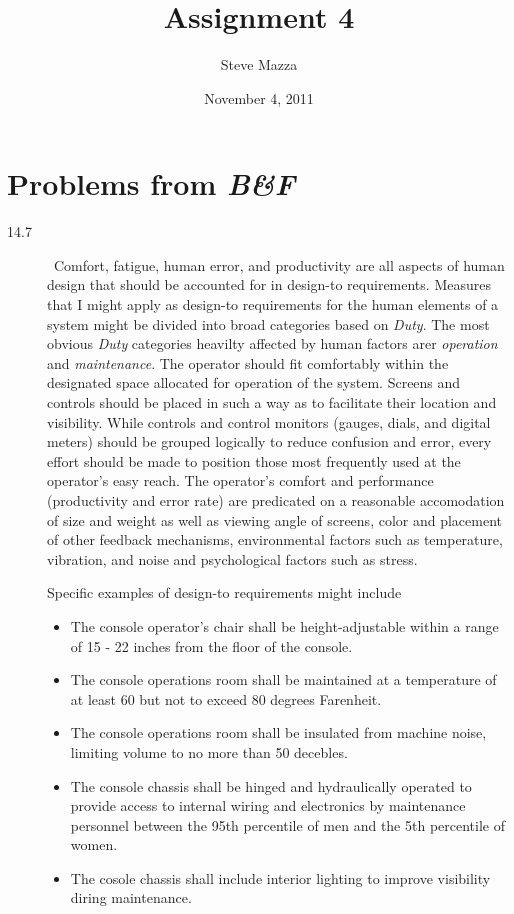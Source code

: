\documentclass[letterpaper,10pt]{article}
\title{Assignment 4}
\author{Steve Mazza}
\date{November 4, 2011}
\begin{document}
\maketitle

\section{Problems from \emph{B\&F}}
\begin{description}
\item[14.7]\ Comfort, fatigue, human error, and productivity are all aspects of human design that should be accounted for in design-to requirements.  Measures that I might apply as design-to requirements for the human elements of a system might be divided into broad categories based on \emph{Duty}.  The most obvious \emph{Duty} categories heavilty affected by human factors arer \emph{operation} and \emph{maintenance}.  The operator should fit comfortably within the designated space allocated for operation of the system.  Screens and controls should be placed in such a way as to facilitate their location and visibility.  While controls and control monitors (gauges, dials, and digital meters) should be grouped logically to reduce confusion and error, every effort should be made to position those most frequently used at the operator's easy reach.  The operator's comfort and performance (productivity and error rate) are predicated on a reasonable accomodation of size and weight as well as viewing angle of screens, color and placement of other feedback mechanisms, environmental factors such as temperature, vibration, and noise and psychological factors such as stress.
\par Specific examples of design-to requirements might include
\begin{itemize}
\item The console operator's chair shall be height-adjustable within a range of 15 - 22 inches from the floor of the console. 
\item The console operations room shall be maintained at a temperature of at least 60 but not to exceed 80 degrees Farenheit.
\item The console operations room shall be insulated from machine noise, limiting volume to no more than 50 decebles.
\item The console chassis shall be hinged and hydraulically operated to provide access to internal wiring and electronics by maintenance personnel between the 95th percentile of men and the 5th percentile of women.
\item The cosole chassis shall include interior lighting to improve visibility diring maintenance.

\end{itemize}
\end{description}
\end{document}
